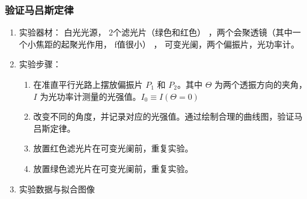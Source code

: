 \documentclass[dvipsnames, svgnames,a4paper,11pt]{article}
\begin{document}
	\subsubsection{验证马吕斯定律}
	\begin{enumerate}
		\item 实验器材： 白光光源， 2个滤光片（绿色和红色） ，两个会聚透镜（其中一个小焦距的起聚光作用，
		f值很小） ， 可变光阑，两个偏振片，光功率计。
		\item 实验步骤：
	\begin{enumerate}
		 \item 在准直平行光路上摆放偏振片 $P_1$ 和 $P_2$。其中 $\Theta$ 为两个透振方向的夹角，$I$ 为光功率计测量的光强值。$I_0\equiv I(\Theta=0)$

		\item 改变不同的角度，并记录对应的光强值。通过绘制合理的曲线图，验证马吕斯定律。
		\item 放置红色滤光片在可变光阑前，重复实验。
		\item 放置绿色滤光片在可变光阑前，重复实验。
	\end{enumerate}	

	\item 实验数据与拟合图像
	

\end{enumerate}
\end{document}
